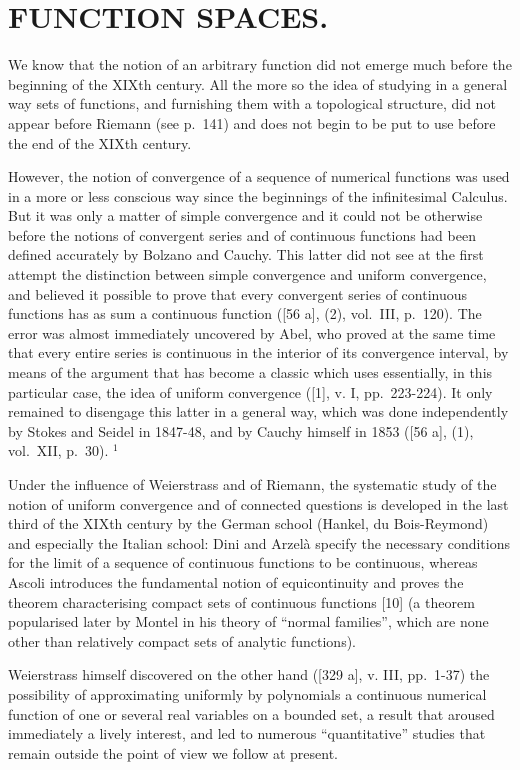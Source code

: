 \chapter{FUNCTION SPACES.}

We know that the notion of an arbitrary function did not emerge much before the beginning of the XIXth century. All the more so the idea of studying in a general way sets of functions, and furnishing them with a topological structure, did not appear before Riemann (see p.~141) and does not begin to be put to use before the end of the XIXth century.

However, the notion of convergence of a sequence of numerical functions was used in a more or less conscious way since the beginnings of the infinitesimal Calculus. But it was only a matter of simple convergence and it could not be otherwise before the notions of convergent series and of continuous functions had been defined accurately by Bolzano and Cauchy. This latter did not see at the first attempt the distinction between simple convergence and uniform convergence, and believed it possible to prove that every convergent series of continuous functions has as sum a continuous function ({[}56 a{]}, (2), vol.~III, p.~120). The error was almost immediately uncovered by Abel, who proved at the same time that every entire series is continuous in the interior of its convergence interval, by means of the argument that has become a classic which uses essentially, in this particular case, the idea of uniform convergence ({[}1{]}, v. I, pp.~223-224). It only remained to disengage this latter in a general way, which was done independently by Stokes and Seidel in 1847-48, and by Cauchy himself in 1853 ({[}56 a{]}, (1), vol.~XII, p.~30). \(^{1}\)

Under the influence of Weierstrass and of Riemann, the systematic study of the notion of uniform convergence and of connected questions is developed in the last third of the XIXth century by the German school (Hankel, du Bois-Reymond) and especially the Italian school: Dini and Arzelà specify the necessary conditions for the limit of a sequence of continuous functions to be continuous, whereas Ascoli introduces the fundamental notion of equicontinuity and proves the theorem characterising compact sets of continuous functions {[}10{]} (a theorem popularised later by Montel in his theory of ``normal families'', which are none other than relatively compact sets of analytic functions).

Weierstrass himself discovered on the other hand ({[}329 a{]}, v. III, pp.~1-37) the possibility of approximating uniformly by polynomials a continuous numerical function of one or several real variables on a bounded set, a result that aroused immediately a lively interest, and led to numerous ``quantitative'' studies that remain outside the point of view we follow at present.

